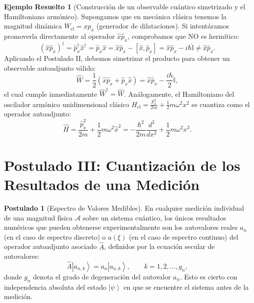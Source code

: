 \documentclass[11pt,a4paper,twoside]{report}
\theoremstyle{definition}
\newtheorem{postulado}{Postulado}[chapter]
\newtheorem{ejemplo}{Ejemplo Resuelto}[chapter]
\theoremstyle{plain}
\theoremstyle{remark}
\newcommand{\ket}[1]{\left| #1 \right\rangle}
\newcommand{\comm}[2]{\left[ #1, #2 \right]}
\newcommand{\op}[1]{\hat{#1}}
\newcommand{\ident}{\hat{\mathbb{I}}}
\begin{document}
\begin{ejemplo}[Construcción de un observable cuántico simetrizado y el Hamiltoniano armónico]
Supongamos que en mecánica clásica tenemos la magnitud dinámica $W_{\text{cl}} = x p_x$ (generador de dilataciones). Si intentáramos promoverla directamente al operador $\op{x}\op{p}_x$, comprobamos que NO es hermítico:
\begin{equation}
    (\op{x}\op{p}_x)^\dagger = \op{p}_x^\dagger \op{x}^\dagger = \op{p}_x \op{x} = \op{x}\op{p}_x - \comm{\op{x}}{\op{p}_x} = \op{x}\op{p}_x - i\hbar\ident \neq \op{x}\op{p}_x.
\end{equation}
Aplicando el Postulado II, debemos simetrizar el producto para obtener un observable autoadjunto válido:
\begin{equation}
    \op{W} = \frac{1}{2}(\op{x}\op{p}_x + \op{p}_x\op{x}) = \op{x}\op{p}_x - \frac{i\hbar}{2}\ident,
\end{equation}
el cual cumple inmediatamente $\op{W}^\dagger = \op{W}$. Análogamente, el Hamiltoniano del oscilador armónico unidimensional clásico $H_{\text{cl}} = \frac{p_x^2}{2m} + \frac{1}{2}m\omega^2 x^2$ se cuantiza como el operador autoadjunto:
\begin{equation}
    \op{H} = \frac{\op{p}_x^2}{2m} + \frac{1}{2}m\omega^2 \op{x}^2 = -\frac{\hbar^2}{2m}\frac{d^2}{dx^2} + \frac{1}{2}m\omega^2 x^2.
\end{equation}
\end{ejemplo}

\section{Postulado III: Cuantización de los Resultados de una Medición}

\begin{postulado}[Espectro de Valores Medibles]
En cualquier medición individual de una magnitud física $\mathcal{A}$ sobre un sistema cuántico, los únicos resultados numéricos que pueden obtenerse experimentalmente son los autovalores reales $a_n$ (en el caso de espectro discreto) o $a(\xi)$ (en el caso de espectro continuo) del operador autoadjunto asociado $\op{A}$, definidos por la ecuación secular de autovalores:
\begin{equation}
    \op{A}\ket{a_{n,k}} = a_n \ket{a_{n,k}}, \qquad k = 1, 2, \dots, g_n,
\end{equation}
donde $g_n$ denota el grado de degeneración del autovalor $a_n$. Esto es cierto con independencia absoluta del estado $\ket{\psi}$ en que se encuentre el sistema antes de la medición.
\end{postulado}
\end{document}
